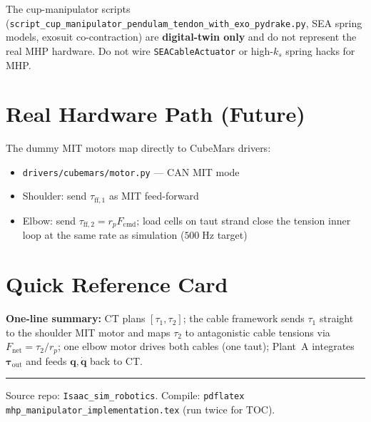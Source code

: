 \documentclass[11pt,a4paper]{article}
\newcommand{\bq}{\bm{q}}
\newcommand{\bqd}{\dot{\bm{q}}}
\newcommand{\btau}{\bm{\tau}}
\begin{document}
\begin{warnbox}[title={Not the legacy cup/exo stack}]
The cup-manipulator scripts (\texttt{script\_cup\_manipulator\_pendulam\_tendon\_with\_exo\_pydrake.py},
SEA spring models, exosuit co-contraction) are \textbf{digital-twin only} and do not
represent the real MHP hardware.  Do not wire \texttt{SEACableActuator} or high-$k_s$
spring hacks for MHP.
\end{warnbox}

\section{Real Hardware Path (Future)}

The dummy MIT motors map directly to CubeMars drivers:
\begin{itemize}[noitemsep]
  \item \texttt{drivers/cubemars/motor.py} --- CAN MIT mode
  \item Shoulder: send $\tau_{\mathrm{ff},1}$ as MIT feed-forward
  \item Elbow: send $\tau_{\mathrm{ff},2}=r_p F_{\mathrm{cmd}}$; load cells on taut strand
        close the tension inner loop at the same rate as simulation ($500\;\mathrm{Hz}$ target)
\end{itemize}

\section{Quick Reference Card}

\begin{resultbox}
\textbf{One-line summary:}
CT plans $[\tau_1,\tau_2]$; the cable framework sends $\tau_1$ straight to the
shoulder MIT motor and maps $\tau_2$ to antagonistic cable tensions via
$F_{\mathrm{net}}=\tau_2/r_p$; one elbow motor drives both cables (one taut);
Plant~A integrates $\btau_{\mathrm{out}}$ and feeds $\bq,\bqd$ back to CT.
\end{resultbox}

\vfill
\hrule
\small
\noindent
Source repo: \texttt{Isaac\_sim\_robotics}.
Compile: \texttt{pdflatex mhp\_manipulator\_implementation.tex} (run twice for TOC).
\end{document}
